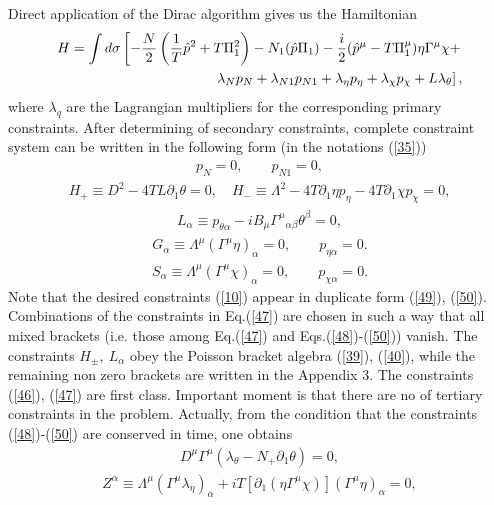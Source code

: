 \documentclass[a4paper]{article}
\begin{document}
Direct application of the Dirac algorithm gives us the Hamiltonian
\begin{eqnarray}\label{45}
H=\int d\sigma\left[-\frac N2\left(\frac {1}{T} \hat p^2+
T\Pi_1^2\right)-N_1(\hat p\Pi_1)-
\frac i2 (\hat p^\mu-T\Pi_1^\mu)\eta\Gamma^\mu\chi+\right. \cr
\left.\lambda_N p_N+\lambda_{N1}p_{N1}+\lambda_\eta p_\eta+
\lambda_\chi p_\chi+L\lambda_\theta\right],
\end{eqnarray}
where $\lambda_q$ are the Lagrangian multipliers for the corresponding 
primary constraints. After determining of secondary constraints, complete 
constraint system can be written in the following form (in the notations 
(\ref{35}))
\begin{eqnarray}\label{46}
p_N=0, \qquad p_{N1}=0,
\end{eqnarray}
\begin{eqnarray}\label{47}
H_+\equiv D^2-4TL\partial_1\theta=0, \quad 
H_-\equiv \Lambda^2-4T\partial_1\eta p_\eta-4T\partial_1\chi p_\chi=0, 
\end{eqnarray}
\begin{eqnarray}\label{48}
L_\alpha\equiv p_{\theta\alpha}- iB_\mu{\Gamma^\mu}_{\alpha\beta}
\theta^\beta=0, 
\end{eqnarray}
\begin{eqnarray}\label{49}
G_\alpha\equiv\Lambda^\mu(\Gamma^\mu\eta)_\alpha=0, \qquad 
p_{\eta\alpha}=0.
\end{eqnarray}
\begin{eqnarray}\label{50}
S_\alpha\equiv\Lambda^\mu(\Gamma^\mu\chi)_\alpha=0, \qquad
p_{\chi\alpha}=0.
\end{eqnarray}
Note that the desired constraints (\ref{10}) appear in duplicate form 
(\ref{49}), (\ref{50}). Combinations of the constraints in 
Eq.(\ref{47}) are chosen in such a way that all mixed brackets 
(i.e. those among Eq.(\ref{47}) and Eqs.(\ref{48})-(\ref{50})) vanish. 
The constraints $H_{\pm}, ~ L_\alpha$ obey the Poisson bracket algebra 
(\ref{39}), (\ref{40}), while the remaining non zero brackets are 
written in the Appendix 3. The constraints (\ref{46}), (\ref{47}) are 
first class. Important moment is that there are no of tertiary 
constraints in the problem. Actually, from the condition that the 
constraints (\ref{48})-(\ref{50}) are conserved in time, one obtains 
\begin{eqnarray}\label{51}
D^\mu\Gamma^\mu(\lambda_\theta-N_+\partial_1\theta)=0, 
\end{eqnarray}
\begin{eqnarray}\label{52} 
Z^\alpha\equiv\Lambda^\mu(\Gamma^\mu\lambda_\eta)_\alpha+
iT[\partial_1(\eta\Gamma^\mu\chi)](\Gamma^\mu\eta)_\alpha=0,
\end{eqnarray}
\end{document}
